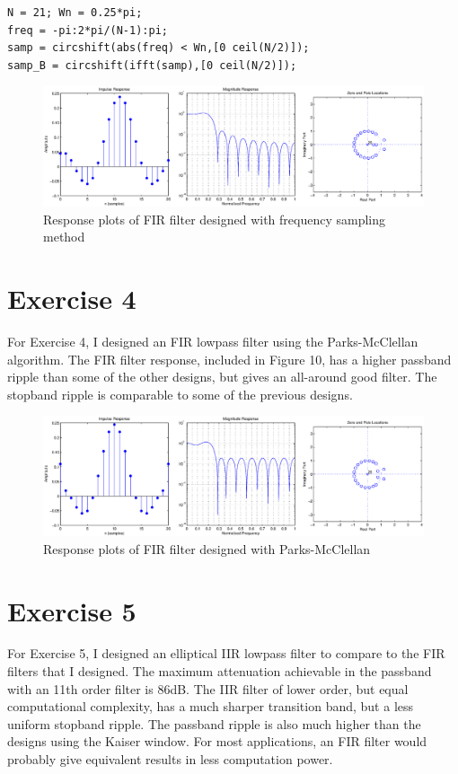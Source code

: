 \documentclass{article}
\begin{document}
\begin{lstlisting}
N = 21; Wn = 0.25*pi;
freq = -pi:2*pi/(N-1):pi;
samp = circshift(abs(freq) < Wn,[0 ceil(N/2)]);
samp_B = circshift(ifft(samp),[0 ceil(N/2)]);
\end{lstlisting}

\begin{figure}[htbp]
\centering
\includegraphics[width=6in]{project7_09.eps}
\caption{Response plots of FIR filter designed with frequency sampling method}
\label{fig:figure9}
\end{figure}

\newpage
\section*{Exercise 4}
\begin{par}
For Exercise 4, I designed an FIR lowpass filter using the Parks-McClellan algorithm.  The FIR filter response, included in Figure 10,  has a higher passband ripple than some of the other designs, but gives an all-around good filter.  The stopband ripple is comparable to some of the previous designs.
\end{par}

\begin{figure}[htbp]
\centering
\includegraphics[width=6in]{project7_10.eps}
\caption{Response plots of FIR filter designed with Parks-McClellan}
\label{fig:figure10}
\end{figure}

\section*{Exercise 5}
\begin{par}
For Exercise 5, I designed an elliptical IIR lowpass filter to compare to the FIR filters that I designed.  The maximum attenuation achievable in the passband with an 11th order filter is 86dB.  The IIR filter of lower order, but equal computational complexity, has a much sharper transition band, but a less uniform stopband ripple.  The passband ripple is also much higher than the designs using the Kaiser window.  For most applications, an FIR filter would probably give equivalent results in less computation power.
\end{par}
\end{document}
